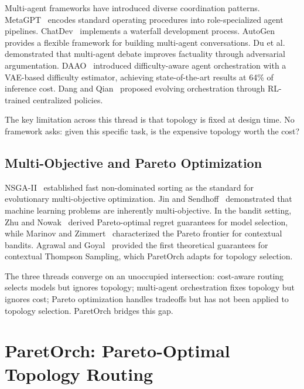 \documentclass{article}
\begin{document}
Multi-agent frameworks have introduced diverse coordination patterns. MetaGPT~\cite{hong2023metagpt} encodes standard operating procedures into role-specialized agent pipelines. ChatDev~\cite{qian2023chatdev} implements a waterfall development process. AutoGen~\cite{wu2023autogen} provides a flexible framework for building multi-agent conversations. Du et al.~\cite{du2023debate} demonstrated that multi-agent debate improves factuality through adversarial argumentation. DAAO~\cite{su2025daao} introduced difficulty-aware agent orchestration with a VAE-based difficulty estimator, achieving state-of-the-art results at 64\% of inference cost. Dang and Qian~\cite{dang2025evolving} proposed evolving orchestration through RL-trained centralized policies.

The key limitation across this thread is that topology is fixed at design time. No framework asks: given this specific task, is the expensive topology worth the cost?

\subsection{Multi-Objective and Pareto Optimization}

NSGA-II~\cite{deb2002nsga2} established fast non-dominated sorting as the standard for evolutionary multi-objective optimization. Jin and Sendhoff~\cite{jin2008pareto_ml} demonstrated that machine learning problems are inherently multi-objective. In the bandit setting, Zhu and Nowak~\cite{zhu2022pareto_bandits} derived Pareto-optimal regret guarantees for model selection, while Marinov and Zimmert~\cite{marinov2021pareto_frontier} characterized the Pareto frontier for contextual bandits. Agrawal and Goyal~\cite{agrawal2013contextual_ts} provided the first theoretical guarantees for contextual Thompson Sampling, which ParetOrch adapts for topology selection.

The three threads converge on an unoccupied intersection: cost-aware routing selects models but ignores topology; multi-agent orchestration fixes topology but ignores cost; Pareto optimization handles tradeoffs but has not been applied to topology selection. ParetOrch bridges this gap.

\section{ParetOrch: Pareto-Optimal Topology Routing}
\label{sec:method}
\end{document}
